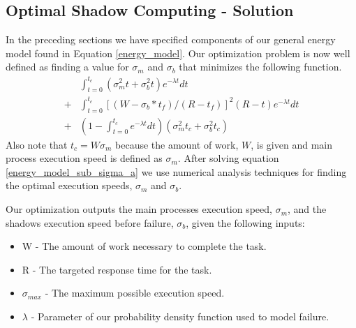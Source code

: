 \subsection{Optimal Shadow Computing - Solution}
\label{closed_form}

In the preceding sections we have specified components of our general
energy model found in Equation \ref{energy_model}. Our optimization
problem is now well defined as finding a value for $\sigma_m$ and
$\sigma_b$ that minimizes the following function.
\begin{equation}
\label{energy_model_sub_sigma_a}
\begin{split}
 & \int_{t=0}^{t_c}(\sigma_m^2t+\sigma_b^2t) e^{-\lambda t}dt \\
+& \int_{t=0}^{t_c}{[(W-\sigma_b*t_f)/(R-t_f)]}^2 (R-t) e^{-\lambda t}dt \\
+& (1-\int_{t=0}^{t_c} e^{-\lambda t} dt)(\sigma_m^2 t_c + \sigma_b^2 t_c)
\end{split}
\end{equation}
Also note that $t_c=W\sigma_m$ because the amount of work, $W$, is
given and main process execution speed is defined as $\sigma_m$. After
solving equation
\ref{energy_model_sub_sigma_a} we use numerical analysis techniques for
 finding the optimal execution speeds, $\sigma_m$ and $\sigma_b$.

Our optimization outputs the main processes execution speed,
$\sigma_m$, and the shadows execution speed before failure,
$\sigma_b$, given the following inputs:
\begin{itemize}
\item
W - The amount of work necessary to complete the task.
\item
R - The targeted response time for the task.
\item
$\sigma_{max}$ - The maximum possible execution speed.
\item
$\lambda$ - Parameter of our probability density function used to model failure.
\end{itemize}

